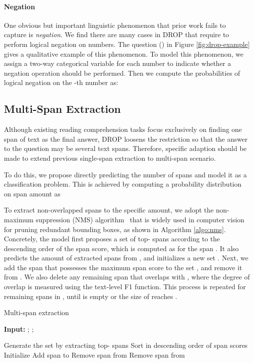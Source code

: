 \documentclass[11pt,a4paper]{article}
\begin{document}
\paragraph{Negation}
One obvious but important linguistic phenomenon that prior work fails to capture is \emph{negation}. 
We find there are many cases in DROP that require to perform logical negation on numbers.
The question () in Figure \ref{fig:drop-example} gives a qualitative example of this phenomenon.
To model this phenomenon, we assign a two-way categorical variable for each number to indicate whether a negation operation should be performed.
Then we compute the probabilities of logical negation on the -th number as:



\subsection{Multi-Span Extraction	\label{sec:multi-span}}
Although existing reading comprehension tasks focus exclusively on finding one span of text as the final answer, DROP loosens the restriction so that the answer to the question may be several text spans. 
Therefore, specific adaption should be made to extend previous single-span extraction to multi-span scenario.

To do this, we propose directly predicting the number of spans and model it as a classification problem. 
This is achieved by computing a probability distribution on span amount as


To extract non-overlapped spans to the specific amount, we adopt the non-maximum suppression (NMS) algorithm~\cite{rosenfeld1971edge} that is widely used in computer vision for pruning redundant bounding boxes, as shown in Algorithm \ref{algo:nms}.
Concretely, the model first proposes a set of top- spans  according to the descending order of the span score, which is computed as  for the span .
It also predicts the amount of extracted spans  from , and initializes a new set .
Next, we add the span  that possesses the maximum span score to the set , and remove it from . 
We also delete any remaining span  that overlaps with , where the degree of overlap is measured using the text-level F1 function. 
This process is repeated for remaining spans in , until  is empty or the size of  reaches . 

\begin{algorithm}[h]
\small
\caption{Multi-span extraction} \label{algo:nms}
{\bf Input:} ; ; 
\begin{algorithmic}[1]
\State Generate the set  by extracting top- spans
\State Sort  in descending order of span scores
\State 
\State Initialize   
		\State Add span  to 
		\State Remove span  from 
			\If{}
				\State Remove span  from 
			\EndIf
		\EndFor
	\EndFor
\EndWhile
\State \Return 
\end{algorithmic}
\end{algorithm}
\end{document}
